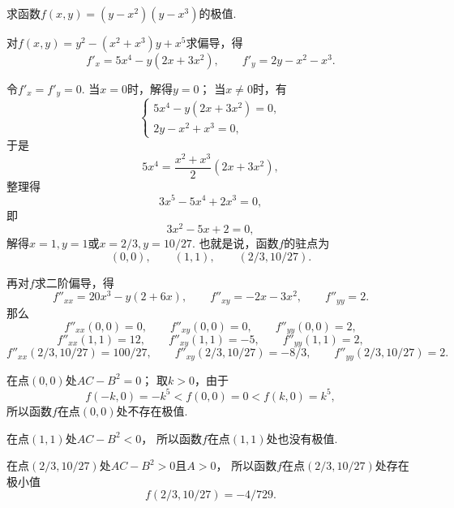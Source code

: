 \begin{example}
求函数\(f(x,y) = (y-x^2)(y-x^3)\)的极值.
\begin{solution}
对\(f(x,y) = y^2 - (x^2+x^3) y + x^5\)求偏导，得\begin{equation*}
	f'_x = 5x^4 - y(2x+3x^2),
	\qquad
	f'_y = 2y - x^2 - x^3.
\end{equation*}

令\(f'_x = f'_y = 0\).
当\(x=0\)时，解得\(y = 0\)；
当\(x\neq0\)时，有\begin{equation*}
	\begin{cases}
		5x^4-y(2x+3x^2) = 0, \\
		2y-x^2+x^3 = 0,
	\end{cases}
\end{equation*}
于是\begin{equation*}
	5x^4 = \frac{x^2+x^3}{2}(2x+3x^2),
\end{equation*}
整理得\begin{equation*}
	3x^5-5x^4+2x^3=0,
\end{equation*}
即\begin{equation*}
	3x^2-5x+2=0,
\end{equation*}
解得\(x=1,y=1\)或\(x=2/3,y=10/27\).
也就是说，函数\(f\)的驻点为\begin{equation*}
	(0,0), \qquad
	(1,1), \qquad
	(2/3,10/27).
\end{equation*}

再对\(f\)求二阶偏导，得\begin{equation*}
	f''_{xx} = 20x^3 - y(2+6x),
	\qquad
	f''_{xy} = -2x-3x^2,
	\qquad
	f''_{yy} = 2.
\end{equation*}
那么
\begin{equation*}
	f''_{xx}(0,0) = 0,
	\qquad
	f''_{xy}(0,0) = 0,
	\qquad
	f''_{yy}(0,0) = 2,
\end{equation*}\begin{equation*}
	f''_{xx}(1,1) = 12,
	\qquad
	f''_{xy}(1,1) = -5,
	\qquad
	f''_{yy}(1,1) = 2,
\end{equation*}\begin{equation*}
	f''_{xx}(2/3,10/27) = 100/27,
	\qquad
	f''_{xy}(2/3,10/27) = -8/3,
	\qquad
	f''_{yy}(2/3,10/27) = 2.
\end{equation*}

在点\((0,0)\)处\(AC-B^2 = 0\)；
取\(k>0\)，由于\begin{equation*}
f(-k,0) = -k^5 < f(0,0) = 0 < f(k,0) = k^5,
\end{equation*}所以函数\(f\)在点\((0,0)\)处不存在极值.

在点\((1,1)\)处\(AC-B^2 < 0\)，
所以函数\(f\)在点\((1,1)\)处也没有极值.

在点\((2/3,10/27)\)处\(AC-B^2 > 0\)且\(A>0\)，
所以函数\(f\)在点\((2/3,10/27)\)处存在极小值\begin{equation*}
	f(2/3,10/27) = -4/729.
\end{equation*}
\end{solution}
\end{example}

